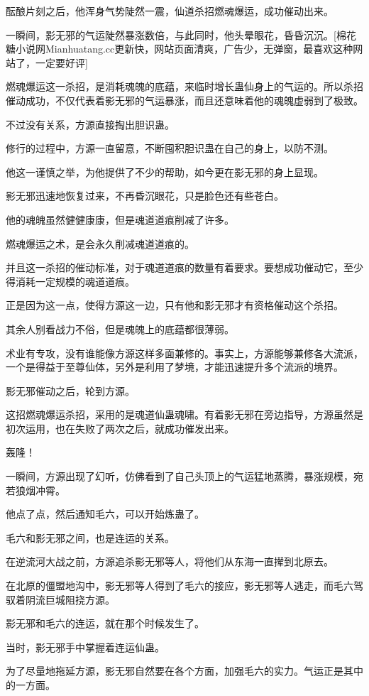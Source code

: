 \begin{this_body}
酝酿片刻之后，他浑身气势陡然一震，仙道杀招燃魂爆运，成功催动出来。

一瞬间，影无邪的气运陡然暴涨数倍，与此同时，他头晕眼花，昏昏沉沉。[棉花糖小说网Mianhuatang.cc更新快，网站页面清爽，广告少，无弹窗，最喜欢这种网站了，一定要好评]

燃魂爆运这一杀招，是消耗魂魄的底蕴，来临时增长蛊仙身上的气运的。所以杀招催动成功，不仅代表着影无邪的气运暴涨，而且还意味着他的魂魄虚弱到了极致。

不过没有关系，方源直接掏出胆识蛊。

修行的过程中，方源一直留意，不断囤积胆识蛊在自己的身上，以防不测。

他这一谨慎之举，为他提供了不少的帮助，如今更在影无邪的身上显现。

影无邪迅速地恢复过来，不再昏沉眼花，只是脸色还有些苍白。

他的魂魄虽然健健康康，但是魂道道痕削减了许多。

燃魂爆运之术，是会永久削减魂道道痕的。

并且这一杀招的催动标准，对于魂道道痕的数量有着要求。要想成功催动它，至少得消耗一定规模的魂道道痕。

正是因为这一点，使得方源这一边，只有他和影无邪才有资格催动这个杀招。

其余人别看战力不俗，但是魂魄上的底蕴都很薄弱。

术业有专攻，没有谁能像方源这样多面兼修的。事实上，方源能够兼修各大流派，一个是得益于至尊仙体，另外是利用了梦境，才能迅速提升多个流派的境界。

影无邪催动之后，轮到方源。

这招燃魂爆运杀招，采用的是魂道仙蛊魂啸。有着影无邪在旁边指导，方源虽然是初次运用，也在失败了两次之后，就成功催发出来。

轰隆！

一瞬间，方源出现了幻听，仿佛看到了自己头顶上的气运猛地蒸腾，暴涨规模，宛若狼烟冲霄。

他点了点，然后通知毛六，可以开始炼蛊了。

毛六和影无邪之间，也是连运的关系。

在逆流河大战之前，方源追杀影无邪等人，将他们从东海一直撵到北原去。

在北原的僵盟地沟中，影无邪等人得到了毛六的接应，影无邪等人逃走，而毛六驾驭着阴流巨城阻挠方源。

影无邪和毛六的连运，就在那个时候发生了。

当时，影无邪手中掌握着连运仙蛊。

为了尽量地拖延方源，影无邪自然要在各个方面，加强毛六的实力。气运正是其中的一方面。


\end{this_body}

